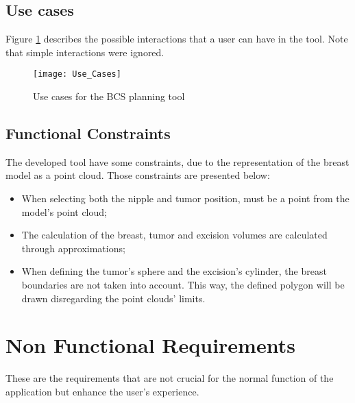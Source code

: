 \begin{longtable}{|l|p{30mm}|l|p{90mm}|}
\end{longtable}

\subsection{Use cases}

Figure \ref{fig:use_cases} describes the possible interactions that a user can have in the tool. Note that simple interactions were ignored.

\begin{figure}[!h]
\begin{center}
    \leavevmode
    \texttt{[image: Use\_Cases]}
    \caption[BCS planning tool Use Cases]{Use cases for the BCS planning tool}
    \label{fig:use_cases}
  \end{center}
\end{figure}

\subsection{Functional Constraints}

The developed tool have some constraints, due to the representation of the breast model as a point cloud. Those constraints are presented below:
\begin{itemize}
\item When selecting both the nipple and tumor position, must be a point from the model's point cloud;
\item The calculation of the breast, tumor and excision volumes are calculated through approximations;
\item When defining the tumor's sphere and the excision's cylinder, the breast boundaries are not taken into account. This way, the defined polygon will be drawn disregarding the point clouds' limits.
\end{itemize}

\section{Non Functional Requirements}

These are the requirements that are not crucial for the normal function of the application but enhance the user's experience. 

